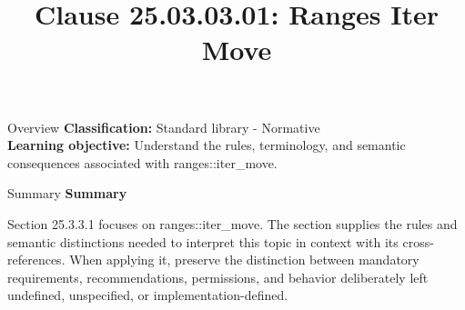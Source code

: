 \documentclass[10pt,letterpaper]{article}
\title{Clause 25.03.03.01: Ranges Iter Move}
\author{}
\date{}
\begin{document}
\maketitle
\begin{CornellOverviewBox}{Overview}
\textbf{Classification:} Standard library - Normative\\[2pt]
\textbf{Learning objective:} Understand the rules, terminology, and semantic consequences associated with ranges::iter\_move.
\end{CornellOverviewBox}\begin{CornellSummaryBox}{Summary}
{\sffamily\bfseries\color{Accent} Summary}\par\vspace{3pt}Section 25.3.3.1 focuses on ranges::iter\_move. The section supplies the rules and semantic distinctions needed to interpret this topic in context with its cross-references. When applying it, preserve the distinction between mandatory requirements, recommendations, permissions, and behavior deliberately left undefined, unspecified, or implementation-defined.
\end{CornellSummaryBox}
\end{document}
